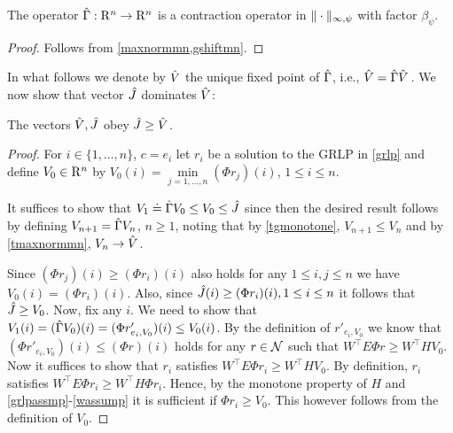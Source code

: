 \begin{theorem}\label{hgmaxcontramn}
The operator $\hat{\Gamma}:\mathrm{R}^n\to\mathrm{R}^n$  is a contraction operator in $\|\cdot\|_{\infty,\psi}$ with factor $\beta_{\psi}$.
\end{theorem}
\begin{proof}
Follows from \cref{maxnormmn,gshiftmn}.
\begin{comment}
We already know that $\hg$ is monotone. That $\hg$ satisfies~\cref{eq:shiftmn}
with $\beta = \beta_{\psi}$ follows similarly to the argument used in  \cref{tgshift}
with modifications similar to those introduced in the proof of \cref{gshiftmn}.
Then, \cref{gmaxcontramn} gives the desired result.
\end{comment}
\end{proof}
In what follows we denote by $\hat{V}$ the unique fixed point of $\hat{\Gamma}$, i.e., $\hat{V} = \hat{\Gamma} \hat{V}\,$. 
We now show that vector $\hat{J}$ dominates $\hat{V}$:
\begin{lemma}\label{relation1}
The vectors $\hat{V},\hat{J}$ obey $\hat{J}\geq\hat{V}$.
\end{lemma}
\begin{proof}
For $i\in \{1,\dots,n\}$, $c=e_i$ let $r_i$ be a solution to the GRLP in \eqref{grlp}
and define $V_0\in \mathrm{R}^n$ by $V_0(i)=\underset{j=1,\ldots,n}{\min}(\Phi r_j)(i)$, $1\le i \le n$.

It suffices to show that $V_1\doteq \hat{\Gamma} V_0 \le V_0 \le \hat{J}$ since then the desired result follows
by defining $V_{n+1} = \hat{\Gamma} V_n$, $n\ge 1$, noting that by \cref{tgmonotone}, $V_{n+1}\le V_{n}$ and by  \cref{tmaxnormmn}, $V_n \to \hat{V}$.

Since $(\Phi r_j)(i) \ge (\Phi r_i)(i)$ also holds for any $1\leq i,j\leq n$ we have $V_0(i)  = (\Phi r_i)(i)$. Also, since $\hat{J}(i) \ge (\Phi r_i)(i),1\leq i \leq n$ it follows that $\hat{J}\geq V_0$. 
Now,  fix any $i$. 
We need to show that $V_1(i)=(\hat{\Gamma} V_0)(i) = (\Phi r'_{e_i,V_0})(i) \leq V_0(i)$. 
By the definition of $r'_{e_i,V_0}$ we know that $(\Phi r'_{e_i,V_0})(i) \le (\Phi r)(i)$
holds for any $r\in \mathcal{N}$ such that $W^\top E \Phi r \ge W^\top H V_0$. 
Now it suffices to show that $r_i$ satisfies $W^\top E \Phi r_i \ge W^\top H V_0$. 
By definition, $r_i$ satisfies $W^\top E \Phi r_i \ge W^\top H \Phi r_i$.
Hence, by the monotone property of $H$ and \cref{grlpassmp}-\eqref{wassump} it is sufficient if $\Phi r_i \ge V_0$.
This however follows from the definition of $V_0$.
\end{proof}
